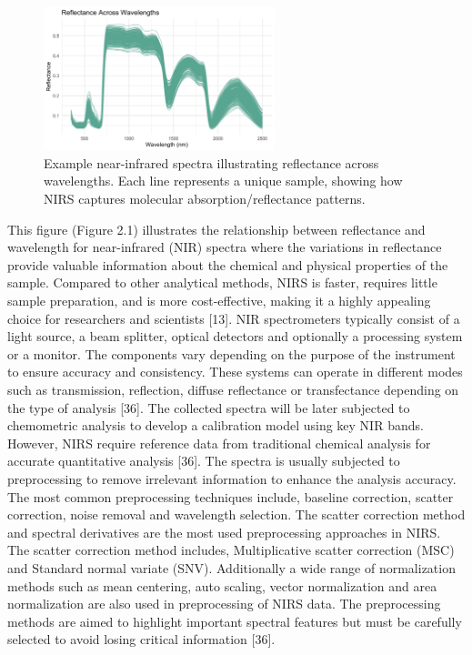 \documentclass[12pt,a4paper]{report}
\begin{document}
\begin{figure}[h]
    \centering
    \includegraphics[width=0.6\textwidth]{images/NIRS_spectra.png} 
    \caption{Example near-infrared spectra illustrating reflectance across wavelengths. Each line represents a unique sample, showing how NIRS captures molecular absorption/reflectance patterns.}
    \label{Figure 5}
\end{figure}

This figure (Figure 2.1)  illustrates the relationship between reflectance and wavelength for near-infrared (NIR) spectra where the variations in reflectance provide valuable information about the chemical and physical properties of the sample. Compared to other analytical methods, NIRS is faster, requires little sample preparation, and is more cost-effective, making it a highly appealing choice for researchers and scientists [13]. NIR spectrometers typically consist of a light source, 
a beam splitter, optical detectors and optionally a processing system or a  monitor. The components vary depending on the purpose of the instrument to ensure accuracy and consistency. These systems can operate in different modes such as transmission, reflection, diffuse reflectance or transfectance depending on the type of analysis [36]. The collected spectra will be later subjected to chemometric analysis to develop a calibration model using key NIR bands. However, NIRS require reference data from traditional chemical analysis for accurate quantitative analysis [36].
The spectra is usually subjected to preprocessing to remove irrelevant information to enhance the analysis accuracy. The most common preprocessing techniques include, baseline correction, scatter correction, noise removal and wavelength selection. The scatter correction method and spectral derivatives are the most used preprocessing approaches in NIRS. The scatter correction method includes, Multiplicative scatter correction (MSC) and Standard normal variate (SNV). Additionally a wide 
range of normalization methods such as mean centering, auto scaling, vector normalization and area normalization are also used in preprocessing of NIRS data. The preprocessing methods are aimed to highlight important spectral features but must be carefully selected to avoid losing critical information [36]. \\
\end{document}
